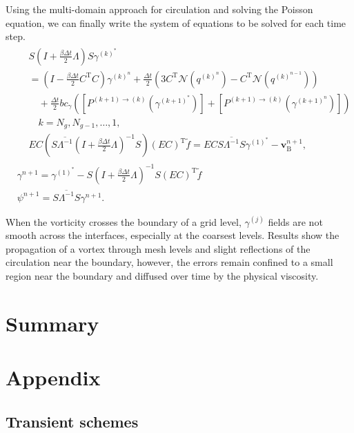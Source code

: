 \documentclass{article}
\numberwithin{equation}{section}
\begin{document}
Using the multi-domain approach for circulation and solving the Poisson equation, we can finally write the system of equations to be solved for each time step. 
\begin{equation}
\begin{aligned}
&\begin{aligned}
& S\left(I+\frac{\beta \Delta t}{2} \Lambda\right) S \gamma^{(k)^*} \\
& =\left(I-\frac{\beta \Delta t}{2} C^{\mathrm{T}} C\right) \gamma^{(k)^n}+\frac{\Delta t}{2}\left(3 C^{\mathrm{T}} \mathscr{N}\left(q^{(k)^n}\right)-C^{\mathrm{T}} \mathscr{N}\left(q^{(k)^{n-1}}\right)\right) \\
& \quad+\frac{\Delta t}{2} b c_\gamma\left(\left[P^{(k+1) \rightarrow(k)}\left(\gamma^{(k+1)^*}\right)\right]+\left[P^{(k+1) \rightarrow(k)}\left(\gamma^{(k+1)^n}\right)\right]\right) \\
& \quad k=N_g, N_{g-1}, \ldots, 1, \\
& E C\left(S \overline{\Lambda^{-1}}\left(I+\frac{\beta \Delta t}{2} \Lambda\right)^{-1} S\right)(E C)^{\mathrm{T}} \tilde{f}=E C S \overline{\Lambda^{-1}} S \gamma^{(1)^*}-\boldsymbol{v}_{\mathrm{B}}^{n+1},
\end{aligned}\\
&\gamma^{n+1}=\gamma^{(1)^*}-S\left(I+\frac{\beta \Delta t}{2} \Lambda\right)^{-1} S(E C)^{\mathrm{T}} \tilde{f}\\
&\psi^{n+1}=S \overline{\Lambda^{-1}} S \gamma^{n+1} .
\end{aligned}
\end{equation}

When the vorticity crosses the boundary of a grid level, $\gamma^{(j)}$ fields are not smooth across the interfaces, especially at the coarsest levels. Results show the propagation of a vortex through mesh levels and slight reflections of the circulation near the boundary, however, the errors remain confined to a small region near the boundary and diffused over time by the physical viscosity. 



	
\section{Summary}\label{sec:summary}
	

\pagebreak


 

\pagebreak
\appendix
\section{Appendix}

\subsection{Transient schemes}
\end{document}
